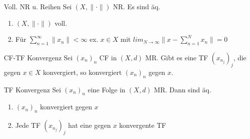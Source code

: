 \begin{satz}{Voll. NR u. Reihen}
  Sei \((X,\|\cdot\|)\) NR. Es sind äq.
  \begin{enumerate}[label=(\roman*)]
    \item \((X,\|\cdot\|)\) voll.
    \item Für \(\sum_{n=1}^\infty \|x_n\| < \infty\) ex.
      \(x\in X\) mit \(lim_{N\to\infty}\|x-
      \sum_{n=1}^N x_n\| = 0\)
  \end{enumerate}
\end{satz}

\begin{satz}{CF-TF Konvergenz}
  Sei \((x_n)_n\) CF in \((X,d)\) MR. Gibt es eine TF
  \((x_{n_j})_j\), die gegen \(x\in X\) konvergiert,
  so konvergiert \((x_n)_n\) gegen \(x\).
\end{satz}

\begin{satz}{TF Konvergenz}
  Sei \((x_n)_n\) eine Folge in \((X,d)\) MR. Dann sind
  äq.
  \begin{enumerate}[label=(\roman*)]
    \item \((x_n)_n\) konvergiert gegen \(x\)
    \item Jede TF \((x_{n_j})_j\) hat eine gegen \(x\)
      konvergente TF
  \end{enumerate}
\end{satz}